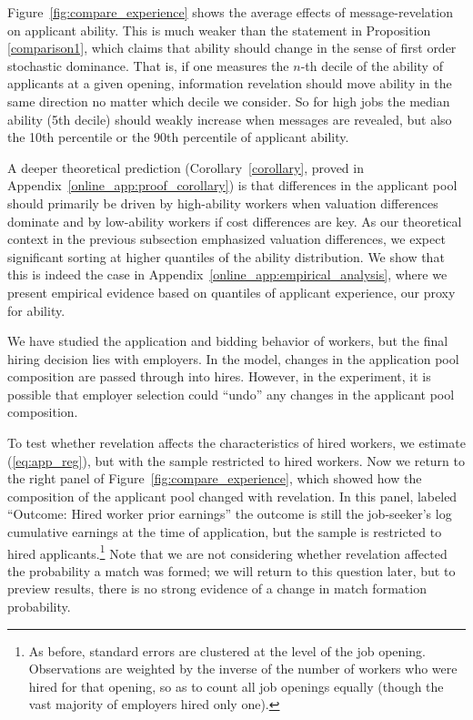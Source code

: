 \documentclass[12pt]{article}
\makeatletter
\renewcommand{\subsection}{%
  \@startsection{subsection}{2}{\z@}%
  {-3.25ex plus -1ex minus -.2ex}%
  {1.5ex plus .2ex}%
  {\normalfont\large\bfseries}%
}
\makeatother
\begin{document}

Figure~\ref{fig:compare_experience} shows the average effects of message-revelation on applicant ability. This is much weaker than the statement in Proposition \ref{comparison1}, which claims that ability should change in the sense of first order stochastic dominance. 
That is, if one measures the $n$-th decile of the ability of applicants at a given opening, information revelation should move ability in the same direction no matter which decile we consider. So for high jobs the median ability (5th decile) should weakly increase when messages are revealed, but also the 10th percentile or the 90th percentile of applicant ability. 

A deeper theoretical prediction (Corollary~\ref{corollary}, proved in Appendix~\ref{online_app:proof_corollary}) is that differences in the applicant pool should primarily be driven by high-ability workers when valuation differences dominate and by low-ability workers if cost differences are key. 
As our theoretical context in the previous subsection emphasized valuation differences, we expect significant sorting at higher quantiles of the ability distribution. 
We show that this is indeed the case in Appendix~\ref{online_app:empirical_analysis}, where we present empirical evidence based on quantiles of applicant experience, our proxy for ability.


We have studied the application and bidding behavior of workers, but the final hiring decision lies with employers.
In the model, changes in the application pool composition are passed through into hires.
However, in the experiment, it is possible that employer selection could ``undo'' any changes in the applicant pool composition. 

To test whether revelation affects the characteristics of hired workers, we estimate (\ref{eq:app_reg}), but with the sample restricted to hired workers.
Now we return to the right panel of Figure~\ref{fig:compare_experience}, which showed how the composition of the applicant pool changed with revelation.
In this panel, labeled ``Outcome: Hired worker prior earnings''  the outcome is still the job-seeker's log cumulative earnings at the time of application, but the sample is restricted to hired applicants.\footnote{
As before, standard errors are clustered at the level of the job opening.
Observations are weighted by the inverse of the number of workers who were hired for that opening, so as to count all job openings equally (though the vast majority of employers hired only one).}
Note that we are not considering whether revelation affected the probability a match was formed; we will return to this question later, but to preview results, there is no strong evidence of a change in match formation probability. 
\end{document}
